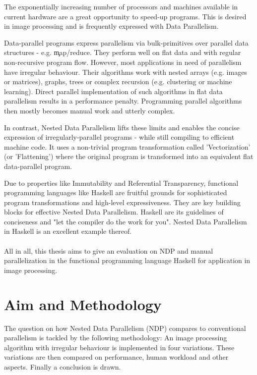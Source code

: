 

The exponentially increasing number of processors and machines
available in current hardware are a great
opportunity to speed-up programs.
This is desired in image processing
and is frequently expressed with Data Parallelism.

Data-parallel programs express parallelism
via bulk-primitives over parallel data structures - e.g. \c{map/reduce}.
They perform well on flat data and with regular
non-recursive program flow.
However, most applications in need of parallelism
have irregular behaviour. Their
algorithms work with nested
arrays (e.g. images or matrices),
graphs, trees or complex recursion (e.g. clustering or machine learning).
Direct parallel implementation of such algorithms
in flat data parallelism results in
a performance penalty.
Programming parallel algorithms then mostly
becomes manual work and utterly complex.

In contrast, Nested Data Parallelism \cite{Belloch1996} lifts these limits
and enables the concise expression of irregularly-parallel programs
- while still compiling to efficient machine code.
It uses a non-trivial program transformation called 'Vectorization'
(or 'Flattening') where the original program is transformed
into an equivalent flat data-parallel program.

Due to properties like Immutability and Referential Transparency,
functional programming languages like Haskell are fruitful grounds for
sophisticated program transformations
and high-level expressiveness. They are key building
blocks for effective Nested Data Parallelism.
Haskell are its guidelines of conciseness
and "let the compiler do the work for you".
Nested Data Parallelism in Haskell
is an excellent example thereof.

\paragraph{}
All in all, this thesis aims to give an evaluation on
NDP and manual parallelization in the functional
programming language Haskell for application
in image processing.


\section{Aim and Methodology}
  The question on how Nested Data Parallelism (NDP) compares to
  conventional parallelism is tackled by the following methodology:
  An image processing algorithm with irregular behaviour
  is implemented in four variations. These variations are
  then compared on performance, human workload and other aspects.
  Finally a conclusion is drawn.
  
